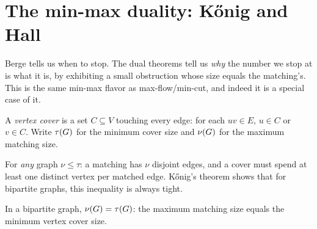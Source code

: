 \section{The min-max duality: K\H{o}nig and Hall}
\label{ch15:konig}

Berge tells us when to stop. The dual theorems tell us \emph{why} the number we
stop at is what it is, by exhibiting a small obstruction whose size equals the
matching's. This is the same min-max flavor as max-flow/min-cut, and indeed it is
a special case of it.

\begin{definition}
\label{ch15:def-cover}
A \emph{vertex cover} is a set $C\subseteq V$ touching every edge: for each
$uv\in E$, $u\in C$ or $v\in C$. Write $\tau(G)$ for the minimum cover size and
$\nu(G)$ for the maximum matching size.
\end{definition}

For \emph{any} graph $\nu\le\tau$: a matching has $\nu$ disjoint edges, and a
cover must spend at least one distinct vertex per matched edge. K\H{o}nig's theorem
shows that for bipartite graphs, this inequality is always tight.

\begin{theorem}[K\H{o}nig, 1931]
\label{ch15:thm-konig}
In a bipartite graph, $\nu(G)=\tau(G)$: the maximum matching size equals
the minimum vertex cover size.
\end{theorem}

